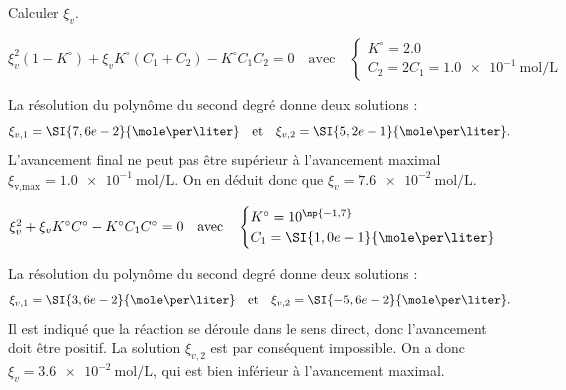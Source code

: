 \medskip

Calculer $\xi_v$.

\debutEntrainement


\begin{enonce}
$\xi^2_v(1-K^\circ)+\xi_v K^\circ\left(C_1+C_2\right)-K^\circ C_1C_2=0
\quad\text{avec}\quad
\begin{cases}
K^\circ=\num{2,0}\\
C_2=2C_1=\SI{1,0e-1}{\mole\per\liter}
\end{cases}
$
\end{enonce}
\begin{corrige}
La résolution du polynôme du second degré donne deux solutions : \vspace{-2mm}
\[
\xi_{v,1}=\SI{7,6e-2}{\mole\per\liter}\quad\text{et}\quad\xi_{v,2}=\SI{5,2e-1}{\mole\per\liter}. \vspace{-1mm}
\]
L'avancement final ne peut pas être supérieur à l'avancement maximal $\xi_\text{v,max}=\SI{1,0e-1}{\mole\per\liter}$. On en déduit donc que $\xi_v=\SI{7,6e-2}{\mole\per\liter}$.
\end{corrige}



\begin{enonce}
$\xi^2_v+\xi_v K^\circ C^\circ-K^\circ C_1 C^\circ=0
\quad\text{avec}\quad
\begin{cases}
K^\circ=10^{\np{-1,7}}\\
C_1=\SI{1,0e-1}{\mole\per\liter}
\end{cases}$
\end{enonce}
\begin{corrige}
La résolution du polynôme du second degré donne deux solutions : \vspace{-2mm}
\[
\xi_{v,1}=\SI{3,6e-2}{\mole\per\liter}\quad\text{et}\quad\xi_{v,2}=\SI{-5,6e-2}{\mole\per\liter}. \vspace{-1mm}
\]
Il est indiqué que la réaction se déroule dans le sens direct, donc l'avancement doit être positif. La solution $\xi_{v,2}$ est par conséquent impossible.
On a donc $\xi_v=\SI{3,6e-2}{\mole\per\liter}$, qui est bien inférieur à l'avancement maximal.
\end{corrige}

